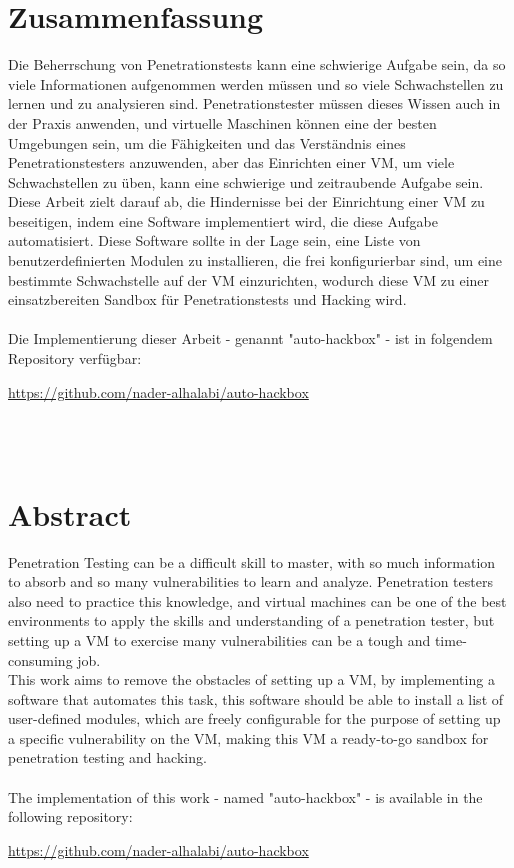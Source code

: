 \chapter*{Zusammenfassung}

Die Beherrschung von Penetrationstests kann eine schwierige Aufgabe sein, da so viele Informationen aufgenommen werden müssen und so viele Schwachstellen zu lernen und zu analysieren sind. Penetrationstester müssen dieses Wissen auch in der Praxis anwenden, und virtuelle Maschinen können eine der besten Umgebungen sein, um die Fähigkeiten und das Verständnis eines Penetrationstesters anzuwenden, aber das Einrichten einer VM, um viele Schwachstellen zu üben, kann eine schwierige und zeitraubende Aufgabe sein.\\
Diese Arbeit zielt darauf ab, die Hindernisse bei der Einrichtung einer VM zu beseitigen, indem eine Software implementiert wird, die diese Aufgabe automatisiert. Diese Software sollte in der Lage sein, eine Liste von benutzerdefinierten Modulen zu installieren, die frei konfigurierbar sind, um eine bestimmte Schwachstelle auf der VM einzurichten, wodurch diese VM zu einer einsatzbereiten Sandbox für Penetrationstests und Hacking wird.
\\
\\
Die Implementierung dieser Arbeit - genannt "auto-hackbox" - ist in folgendem Repository verfügbar:\\
\centerline{\url{https://github.com/nader-alhalabi/auto-hackbox}}
\\
\\
\chapter*{Abstract}

Penetration Testing can be a difficult skill to master, with so much information to absorb and so many vulnerabilities to learn and analyze. Penetration testers also need to practice this knowledge, and virtual machines can be one of the best environments to apply the skills and understanding of a penetration tester, but setting up a VM to exercise many vulnerabilities can be a tough and time-consuming job.\\
This work aims to remove the obstacles of setting up a VM, by implementing a software that automates this task, this software should be able to install a list of user-defined modules, which are freely configurable for the purpose of setting up a specific vulnerability on the VM, making this VM a ready-to-go sandbox for penetration testing and hacking.
\\
\\
The implementation of this work - named "auto-hackbox" - is available in the following repository:\\
\centerline{\url{https://github.com/nader-alhalabi/auto-hackbox}}
